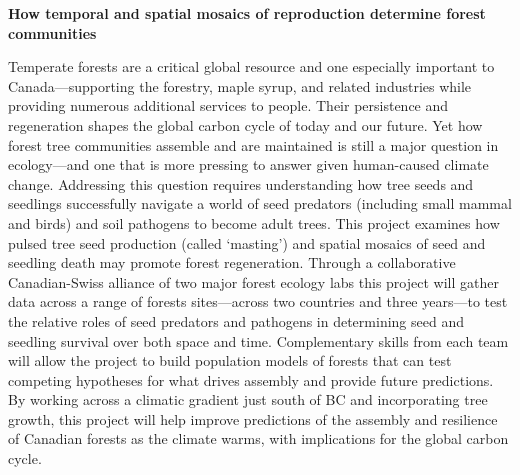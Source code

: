 \documentclass[12pt,oneside]{article}
\begin{document}


\thispagestyle{empty}
\begin{center}
{\bf How temporal and spatial mosaics of reproduction determine forest communities} 
\vspace{-1ex}
\end{center}

Temperate forests are a critical global resource and one especially important to Canada---supporting the forestry, maple syrup, and related industries while providing numerous additional services to people. Their persistence and regeneration shapes the global carbon cycle of today and our future. Yet how forest tree communities assemble and are maintained is still a major question in ecology---and one that is more pressing to answer given human-caused climate change. Addressing this question requires understanding how tree seeds and seedlings successfully navigate a world of seed predators (including small mammal and birds) and soil pathogens to become adult trees. This project examines how pulsed tree seed production (called `masting') and spatial mosaics of seed and seedling death may promote forest regeneration. Through a collaborative Canadian-Swiss alliance of two major forest ecology labs this project will gather data across a range of forests sites---across two countries and three years---to test the relative roles of seed predators and pathogens in determining seed and seedling survival over both space and time. Complementary skills from each team will allow the project to build population models of forests that can test competing hypotheses for what drives assembly and provide future predictions. By working across a climatic gradient just south of BC and incorporating tree growth, this project will help improve predictions of the assembly and resilience of Canadian forests as the climate warms, with implications for the global carbon cycle. 
\end{document}
